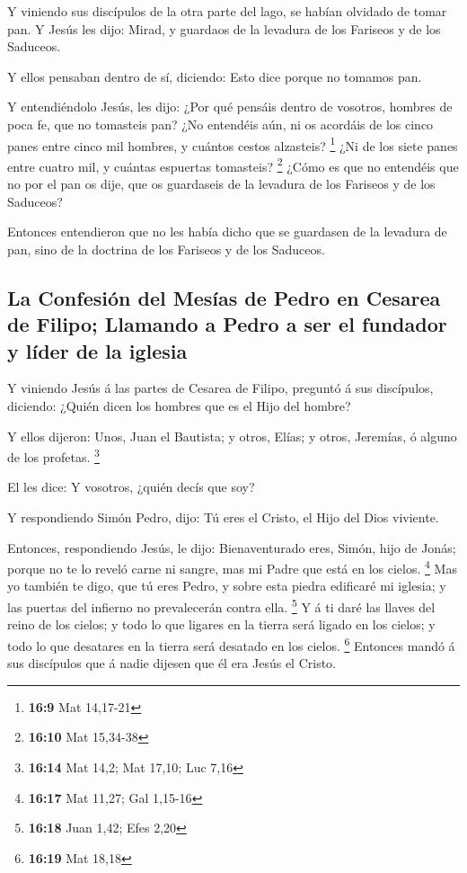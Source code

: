 Y viniendo sus discípulos de la otra parte del lago, se
habían olvidado de tomar pan.  Y Jesús les dijo: Mirad, y
guardaos de la levadura de los Fariseos y de los Saduceos.

 Y ellos pensaban dentro de sí, diciendo: Esto dice porque
no tomamos pan.

 Y entendiéndolo Jesús, les dijo: ¿Por qué pensáis dentro
de vosotros, hombres de poca fe, que no tomasteis pan? 
¿No entendéis aún, ni os acordáis de los cinco panes entre cinco mil
hombres, y cuántos cestos alzasteis? \footnote{\textbf{16:9} Mat
  14,17-21}  ¿Ni de los siete panes entre cuatro mil, y
cuántas espuertas tomasteis? \footnote{\textbf{16:10} Mat 15,34-38}
 ¿Cómo es que no entendéis que no por el pan os dije, que
os guardaseis de la levadura de los Fariseos y de los Saduceos?

 Entonces entendieron que no les había dicho que se
guardasen de la levadura de pan, sino de la doctrina de los Fariseos y
de los Saduceos.

\hypertarget{la-confesiuxf3n-del-mesuxedas-de-pedro-en-cesarea-de-filipo-llamando-a-pedro-a-ser-el-fundador-y-luxedder-de-la-iglesia}{%
\subsection{La Confesión del Mesías de Pedro en Cesarea de Filipo;
Llamando a Pedro a ser el fundador y líder de la
iglesia}\label{la-confesiuxf3n-del-mesuxedas-de-pedro-en-cesarea-de-filipo-llamando-a-pedro-a-ser-el-fundador-y-luxedder-de-la-iglesia}}

 Y viniendo Jesús á las partes de Cesarea de Filipo,
preguntó á sus discípulos, diciendo: ¿Quién dicen los hombres que es el
Hijo del hombre?

 Y ellos dijeron: Unos, Juan el Bautista; y otros, Elías;
y otros, Jeremías, ó alguno de los profetas. \footnote{\textbf{16:14}
  Mat 14,2; Mat 17,10; Luc 7,16}

 El les dice: Y vosotros, ¿quién decís que soy?

 Y respondiendo Simón Pedro, dijo: Tú eres el Cristo, el
Hijo del Dios viviente.

 Entonces, respondiendo Jesús, le dijo: Bienaventurado
eres, Simón, hijo de Jonás; porque no te lo reveló carne ni sangre, mas
mi Padre que está en los cielos. \footnote{\textbf{16:17} Mat 11,27; Gal
  1,15-16}  Mas yo también te digo, que tú eres Pedro, y
sobre esta piedra edificaré mi iglesia; y las puertas del infierno no
prevalecerán contra ella. \footnote{\textbf{16:18} Juan 1,42; Efes 2,20}
 Y á ti daré las llaves del reino de los cielos; y todo
lo que ligares en la tierra será ligado en los cielos; y todo lo que
desatares en la tierra será desatado en los cielos. \footnote{\textbf{16:19}
  Mat 18,18}  Entonces mandó á sus discípulos que á nadie
dijesen que él era Jesús el Cristo.

